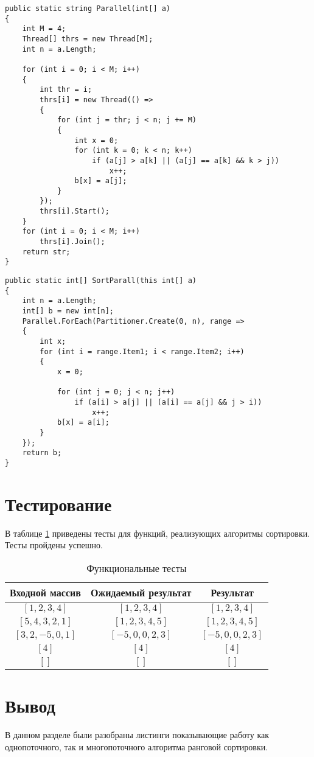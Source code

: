 \begin{lstlisting}[label=lst:mnog,caption=Алгоритм ранговой сортировки (многопоточный)]
public static string Parallel(int[] a)
{
	int M = 4;
	Thread[] thrs = new Thread[M];
	int n = a.Length;

	for (int i = 0; i < M; i++)
	{
		int thr = i;
		thrs[i] = new Thread(() =>
		{
			for (int j = thr; j < n; j += M)
			{
				int x = 0;
				for (int k = 0; k < n; k++)
					if (a[j] > a[k] || (a[j] == a[k] && k > j))
						x++;
				b[x] = a[j];
			}
		});
		thrs[i].Start();
	}
	for (int i = 0; i < M; i++) 
		thrs[i].Join();
	return str;
}
\end{lstlisting}

\begin{lstlisting}[label=lst:dop,caption=Алгоритм ранговой сортировки (обычный)]
public static int[] SortParall(this int[] a)
{
	int n = a.Length;
	int[] b = new int[n];
	Parallel.ForEach(Partitioner.Create(0, n), range =>
	{
		int x;
		for (int i = range.Item1; i < range.Item2; i++)
		{
			x = 0;
			
			for (int j = 0; j < n; j++)
				if (a[i] > a[j] || (a[i] == a[j] && j > i))
					x++;
			b[x] = a[i]; 
		}
	});
	return b;
}
\end{lstlisting}

\section{Тестирование}

В таблице \ref{tbl:functional_test} приведены тесты для функций, реализующих алгоритмы сортировки. Тесты пройдены успешно.


\begin{table}[h]
	\begin{center}
		\caption{\label{tbl:functional_test} Функциональные тесты}
		\begin{tabular}{|c|c|c|}
			\hline
			Входной массив & Ожидаемый результат & Результат \\ 
			\hline
			$[1,2,3,4]$ & $[1,2,3,4]$  & $[1,2,3,4]$\\
			$[5,4,3,2,1]$  & $[1,2,3,4,5]$ & $[1,2,3,4,5]$\\
			$[3,2,-5,0,1]$  & $[-5,0,0,2,3]$  & $[-5,0,0,2,3]$\\
			$[4]$  & $[4]$  & $[4]$\\
			$[]$  & $[]$  & $[]$\\
			\hline
		\end{tabular}
	\end{center}
\end{table}


\section*{Вывод}
В данном разделе были разобраны листинги  показывающие
работу как однопоточного, так и многопоточного алгоритма ранговой сортировки.
